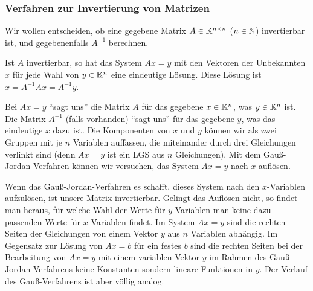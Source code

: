 \subsubsection{Verfahren zur Invertierung von Matrizen}

Wir wollen entscheiden, ob eine gegebene Matrix $ A \in \mathbb K^{n \times n}$ ($n \in \mathbb N$) invertierbar ist, und gegebenenfalls $ A^{-1} $ berechnen.

Ist $ A $ invertierbar, so hat das System $ Ax = y $ mit den Vektoren der Unbekannten $ x $ für jede Wahl von $ y \in \mathbb K^n $ eine eindeutige Lösung. Diese Lösung ist $ x = A^{-1}Ax = A^{-1}y $.

Bei $A x =y$ ``sagt uns'' die Matrix $A$ für das gegebene $x \in \mathbb K^n$, was $y \in \mathbb K^n$ ist. Die Matrix $A^{-1}$ (falls vorhanden) ``sagt uns'' für das gegebene $y$, was das eindeutige $x$ dazu ist. Die Komponenten von $x$ und $y$ können wir als zwei Gruppen mit je $n$ Variablen auffassen, die miteinander durch drei Gleichungen verlinkt sind (denn $A x=y$ ist ein LGS aus $n$ Gleichungen). Mit dem Gauß-Jordan-Verfahren können wir versuchen, das System $A x = y$ nach $x$ auflösen. 

Wenn das Gauß-Jordan-Verfahren es schafft, dieses System nach den $x$-Variablen aufzulösen, ist unsere Matrix invertierbar. Gelingt das Auflösen nicht, so findet man heraus, für welche Wahl der Werte für $y$-Variablen man keine dazu passenden Werte für $x$-Variablen findet. Im System $A x = y$ sind die rechten Seiten der Gleichungen von einem Vektor $y$ aus $n$ Variablen abhängig. Im Gegensatz zur Lösung von $A x=b$ für ein festes $b$ sind  die rechten Seiten bei der Bearbeitung von $A  x= y$ mit einem variablen Vektor $y$ im Rahmen des Gauß-Jordan-Verfahrens keine Konstanten sondern lineare Funktionen in $y$. Der Verlauf des Gauß-Verfahrens ist aber völlig analog. 


